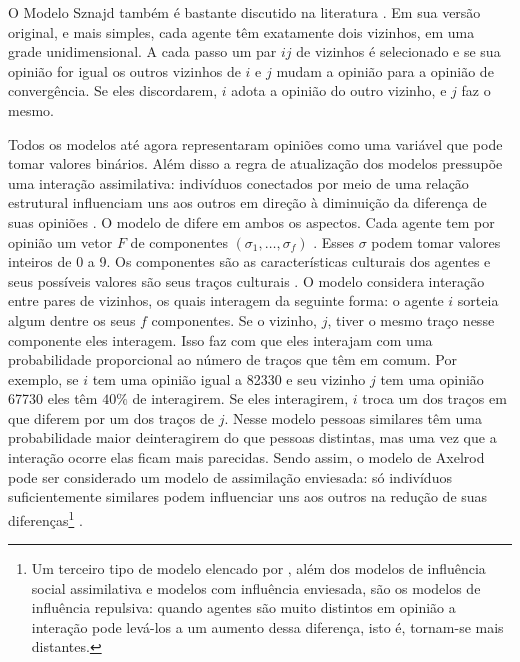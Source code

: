   O Modelo Sznajd também é bastante discutido na literatura
  \cite{sznajd2000opinion, sirbu2017opinion,castellano2012social}. Em sua versão
  original, e mais simples, cada agente têm exatamente dois vizinhos, em uma
  grade unidimensional. A cada passo um par $ij$ de vizinhos é selecionado e se
  sua opinião for igual os outros vizinhos de \(i\) e \(j\) mudam a opinião para
  a opinião de convergência. Se eles discordarem, \(i\) adota a opinião do outro
  vizinho, e \(j\) faz o mesmo.

  Todos os modelos até agora representaram opiniões como uma variável que pode
  tomar valores binários. Além disso a regra de atualização dos modelos
  pressupõe uma interação assimilativa: indivíduos conectados por meio de uma
  relação estrutural influenciam uns aos outros em direção à diminuição da
  diferença de suas opiniões \cite{flache2017}. O modelo de
   difere em ambos os aspectos. Cada agente
  tem por opinião um vetor $F$ de componentes $(\sigma_1 , \ldots, \sigma_f)$
  \cite{klemm2003role}. Esses $\sigma$ podem tomar valores inteiros de 0 a 9. Os
  componentes são as características culturais dos agentes e seus possíveis
  valores são seus traços culturais \cite{gomes2014}. O modelo considera
  interação entre pares de vizinhos, os quais interagem da seguinte forma: o
  agente \(i\) sorteia algum dentre os seus \(f\) componentes. Se o vizinho,
  \(j\), tiver o mesmo traço nesse componente eles interagem. Isso faz com que
  eles interajam com uma probabilidade proporcional ao número de traços que têm
  em comum. Por exemplo, se \(i\) tem uma opinião igual a 82330 e seu vizinho
  \(j\) tem uma opinião 67730 eles têm \(40 \%\) de interagirem. Se eles
  interagirem, \(i\) troca um dos traços em que diferem por um dos traços de
  \(j\)\cite{axelrod1997dissemination}. Nesse modelo pessoas similares têm uma probabilidade maior
  deinteragirem do que pessoas distintas, mas uma vez que a interação ocorre
  elas ficam mais parecidas. Sendo assim, o modelo de Axelrod pode ser
  considerado um modelo de assimilação enviesada: só indivíduos suficientemente
  similares podem influenciar uns aos outros na redução de suas
  diferenças\footnote{Um terceiro tipo de modelo elencado por
    , além dos modelos de influência social assimilativa
    e modelos com influência enviesada, são os modelos de influência repulsiva:
    quando agentes são muito distintos em opinião a interação pode levá-los a um
    aumento dessa diferença, isto é, tornam-se mais distantes.}
  \cite{flache2017}.


